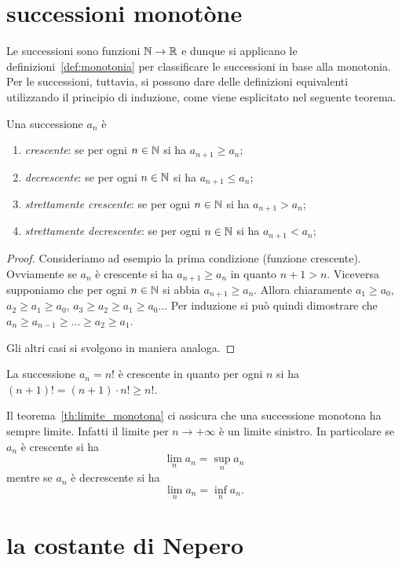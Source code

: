 \section{successioni monotòne}

Le successioni sono funzioni ${\mathbb N} \to {\mathbb R}$ e dunque si applicano 
le definizioni~\ref{def:monotonia} per
classificare le successioni in base alla monotonia.
Per le successioni, tuttavia, si possono dare delle definizioni
equivalenti utilizzando il principio di induzione,
come viene esplicitato nel seguente teorema.

\begin{theorem}
\mymark{***}
Una successione $a_n$ è
\begin{enumerate}
\item \emph{crescente}: se per ogni $n\in {\mathbb N}$ si ha $a_{n+1} \ge a_n$;
\item \emph{decrescente}: se per ogni $n\in {\mathbb N}$ si ha $a_{n+1} \le a_n$;
\item \emph{strettamente crescente}: se per ogni $n\in {\mathbb N}$ si ha $a_{n+1}>a_n$;
\item \emph{strettamente decrescente}: se per ogni $n\in {\mathbb N}$ si ha
$a_{n+1}<a_n$;
\end{enumerate}
\end{theorem}
%
\begin{proof}
  Consideriamo ad esempio la prima condizione (funzione crescente).
Ovviamente se $a_n$ è crescente si ha $a_{n+1}\ge a_n$ in quanto $n+1 > n$.
Viceversa supponiamo che per ogni $n\in {\mathbb N}$ si abbia $a_{n+1}\ge a_n$.  Allora
chiaramente $a_1\ge a_0$, $a_2\ge a_1 \ge a_0$, $a_3 \ge a_2 \ge a_1 \ge a_0$...
Per induzione si può quindi dimostrare che  $a_n \ge a_{n-1} \ge \dots \ge a_2
\ge a_1$.

Gli altri casi si svolgono in maniera analoga.
\end{proof}

\begin{example}
  La successione $a_n = n!$ è crescente 
  in quanto per ogni $n$ si ha $(n+1)! = (n+1)\cdot n! \ge n!$.
\end{example}

Il teorema~\ref{th:limite_monotona} ci assicura che una 
successione monotona ha sempre limite. 
Infatti il limite per $n\to +\infty$ è un limite sinistro.
In particolare se $a_n$ è crescente si ha 
\[
  \lim_n a_n = \sup_n a_n
\]
mentre se $a_n$ è decrescente si ha 
\[
  \lim_n a_n = \inf_n a_n.
\]

\section{la costante di Nepero}

